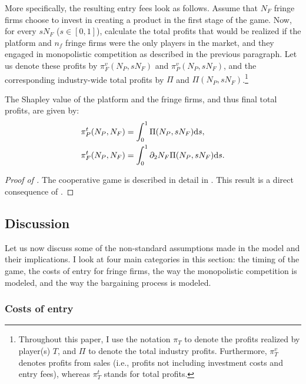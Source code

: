More specifically, the resulting entry fees look as follows.
Assume that $N_F$ fringe firms choose to invest in creating a product in the first stage of the game.
Now, for every $s N_F$ ($s \in [0, 1]$), calculate the total profits that would be realized if the platform and $n_f$ fringe firms were the only players in the market, and they engaged in monopolistic competition as described in the previous paragraph.
Let us denote these profits by $\pi^v_{F}(N_P,s N_F)$ and $\pi^v_{P}(N_P,s N_F)$, and the corresponding industry-wide total profits by $\Pi$ and $\Pi(N_P,s N_F)$.\footnote{
    Throughout this paper, I use the notation $\pi_T$ to denote the profits realized by player(s) $T$, and $\Pi$ to denote the total industry profits.
    Furthermore, $\pi^v_T$ denotes profits from sales (i.e., profits not including investment costs and entry fees), whereas $\pi^t_T$ stands for total profits.
}

\begin{proposition}
    \label{prop:shapley_value}
    The Shapley value of the platform and the fringe firms, and thus final total profits, are given by:
    \begin{align*}
        \pi^t_P(N_P, N_F) &= \int_0^1 \Pi(N_P,s N_F) \mathrm{d}s, \\
        \pi^t_F(N_P, N_F) &= \int_0^1 \partial_2 N_F \Pi(N_P,s N_F) \mathrm{d}s.
    \end{align*}
\end{proposition}
\begin{proof}[Proof of ]
    The cooperative game is described in detail in .
    This result is a direct consequence of .
\end{proof}

\subsection{Discussion}
\label{sec:model_discussion}

Let us now discuss some of the non-standard assumptions made in the model and their implications.
I look at four main categories in this section: the timing of the game, the costs of entry for fringe firms, the way the monopolistic competition is modeled, and the way the bargaining process is modeled.

\subsubsection{Costs of entry}

